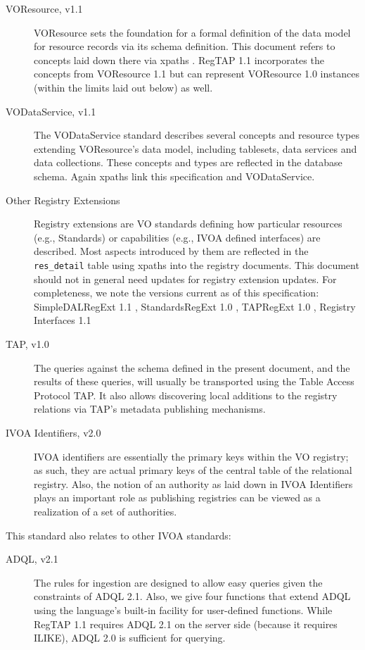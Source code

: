 \documentclass[11pt,a4paper]{ivoa}
\newcommand{\rtent}[1]{\texttt{\color{rtcolor} #1}}
\begin{document}
\begin{description}
\item[VOResource, v1.1 \citep{2018ivoa.spec.0625P}] VOResource sets the foundation for a formal definition of the data
model for resource records via its schema definition.  This document
refers to concepts laid down there via xpaths \citep{std:XPATH}.  RegTAP
1.1 incorporates the concepts from VOResource 1.1 but can represent
VOResource 1.0 instances (within the limits laid out below) as well.
\item[VODataService, v1.1 \citep{std:VODS11}] The VODataService standard 
describes several concepts and resource types extending 
VOResource's data model, including
tablesets, data services and data
collections.  These concepts and types are reflected in the database
schema.  Again xpaths link this specification and VODataService.
\item[Other Registry Extensions]Registry extensions are VO standards
defining how particular resources (e.g., Standards) or capabilities
(e.g., IVOA defined interfaces) are described.  Most aspects
introduced by them are reflected in the \rtent{res\_detail} table using
xpaths into the registry documents.
This document should not in general need updates
for registry extension updates.  For completeness, we note the
versions current as of this specification: SimpleDALRegExt 1.1
\citep{2017ivoa.spec.0530P},
StandardsRegExt 1.0 \citep{std:STDREGEXT}, TAPRegExt 1.0
\citep{std:TAPREGEXT}, Registry Interfaces 1.1
\citep{2018ivoa.spec.0723D}
\item[TAP, v1.0 \citep{std:TAP}]The queries against the schema defined in the present document, and the results of
these queries, will usually be transported using the Table Access
Protocol TAP.  It also allows discovering
local additions to the registry relations via TAP's metadata publishing
mechanisms.
\item[IVOA Identifiers, v2.0 \citep{2016ivoa.spec.0523D}]IVOA identifiers are
essentially the primary keys within the VO
registry; as such, they are actual primary keys of the central table of
the relational registry. Also, the notion of an authority as laid down
in IVOA Identifiers plays an important role as publishing registries can
be viewed as a realization of a set of authorities.

\end{description}

This standard also relates to other IVOA standards:


\begin{description}
\item[ADQL, v2.1 \citep{TODO}]The rules for ingestion are designed to allow
easy queries given the constraints of ADQL 2.1.  Also,
we give four functions that extend ADQL using the
language's built-in facility for user-defined functions.  While RegTAP
1.1 requires ADQL 2.1 on the server side (because it requires ILIKE),
ADQL 2.0 is sufficient for querying.
\end{description}
\end{document}
